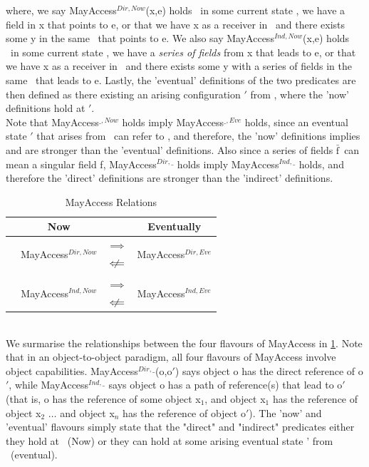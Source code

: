 \documentclass[a4paper,11pt,twoside]{article}
\newcommand*\rot{\rotatebox{90}}
\newcommand{\loimplies}{$\implies$}
\newcommand{\lonimplies}{$\centernot\implies$}
\newcommand{\loimpliedby}{$\Longleftarrow$}
\newcommand{\lonimpliedby}{$\centernot\Longleftarrow$}
\newcommand{\losigma}{\text{$\upsigma$}}
\newcommand{\loconj}[1] {$\bar{\text{#1}}$}
\newcommand{\lotiff} {\textit{\textls[-20]{iff}}}
\begin{document}
where, we say MayAccess$^{Dir,Now}$(x,e) holds \lotiff\ in some current state \losigma, we have a field in x that points to e, or that we have x as a receiver in \losigma\ and there exists some y in the same \losigma\ that points to e. We also say MayAccess$^{Ind,Now}$(x,e) holds \lotiff\ in some current state \losigma, we have a \textit{series of fields} from x that leads to e, or that we have x as a receiver in \losigma\ and there exists some y with a series of fields in the same \losigma\ that leads to e. Lastly, the 'eventual' definitions of the two predicates are then defined as there existing an arising configuration \losigma$'$ from \losigma, where the 'now' definitions hold at \losigma$'$.\\

Note that MayAccess$^{\_,Now}$ holds imply MayAccess$^{\_,Eve}$ holds, since an eventual state \losigma$'$ that arises from \losigma\, can refer to \losigma, and therefore, the 'now' definitions implies and are stronger than the 'eventual' definitions. Also since a series of fields \loconj{f}\ can mean a singular field f, MayAccess$^{Dir,\_}$ holds imply MayAccess$^{Ind,\_}$ holds, and therefore the 'direct' definitions are stronger than the 'indirect' definitions. \\
\begin{table}[htb]
\caption{MayAccess Relations}\label{tab:accessrelations}
\centering
\begin{tabular*}{0.5\linewidth}{c|ccc}\toprule
& \bf Now & & \bf Eventually\\
\hline
\multirow{5}{*}{\rot{\bf Indirect \enspace Direct \:}} & \multirow{2}{*}{MayAccess$^{Dir,Now}$} & \loimplies & \multirow{2}{*}{MayAccess$^{Dir, Eve}$} \\
& & \lonimpliedby &  \\
& \rot{\loimpliedby} \rot{\lonimplies}& &\rot{\loimpliedby} \rot{\lonimplies} \\
& \multirow{2}{*}{MayAccess$^{Ind,Now}$} & \loimplies & \multirow{2}{*}{MayAccess$^{Ind, Eve}$} \\
& & \lonimpliedby &\\
\end{tabular*}
\end{table}\\
We surmarise the relationships between the four flavours of MayAccess in \cref{tab:accessrelations}. Note that in an object-to-object paradigm, all four flavours of MayAccess involve object capabilities. MayAccess$^{Dir,\_}$(o,o$'$) says object o has the direct reference of o$'$, while MayAccess$^{Ind,\_}$ says object o has a path of reference(s) that lead to o$'$ (that is, o has the reference of some object x$_1$, and object x$_1$ has the reference of object x$_2$ $\dots$ and object x$_n$ has the reference of object o$'$). The 'now' and 'eventual' flavours simply state that the "direct" and "indirect" predicates either they hold at \losigma\ (Now) or they can hold at some arising eventual state \losigma' from \losigma\ (eventual).
\end{document}
